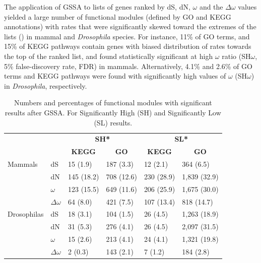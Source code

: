 The application of GSSA to lists of genes ranked by dS, dN, $\omega$ and the $\Delta\omega$ values yielded a large number of functional modules (defined by GO and KEGG annotations) with rates that were significantly skewed toward the extremes of the lists () in mammal and \textit{Drosophila} species. For instance, 11\% of GO terms, and 15\% of KEGG pathways contain genes with biased distribution of rates towards the top of the ranked list, and found statistically significant at high $\omega$ ratio (SH$\omega$, 5\% false-discovery rate, FDR) in mammals. Alternatively, 4.1\% and 2.6\% of GO terms and KEGG pathways were found with significantly high values of $\omega$ (SH$\omega$) in \textit{Drosophila}, respectively.

\begin{table}[htbp]
\begin{center}
\begin{tabular}{ l l l l l l }
\hline
 &  & \multicolumn{ 2}{c}{\textbf{SH*}} & \multicolumn{ 2}{c}{\textbf{SL*}} \\  \cline{ 3- 4} \cline{4-6}
 &  & \multicolumn{1}{c}{\textbf{KEGG }} & \multicolumn{1}{c}{\textbf{GO }} & \multicolumn{1}{c}{\textbf{KEGG }} & \multicolumn{1}{c}{\textbf{GO}} \\ \hline
\multicolumn{ 1}{l}{Mammals} &  dS  &  15 (1.9)    &  187 (3.3)   &  12 (2.1)    &  364 (6.5) \\
\multicolumn{ 1}{l}{} &  dN  &  145 (18.2)  &  708 (12.6)  &  230 (28.9)  &  1,839 (32.9) \\
\multicolumn{ 1}{l}{} & $\omega$ &  123 (15.5)  &  649 (11.6)  &  206 (25.9)  &  1,675 (30.0) \\
\multicolumn{ 1}{l}{} & $\Delta\omega$ &  64 (8.0)    &  421 (7.5)   &  107 (13.4)  &  818 (14.7) \\ \hline
\multicolumn{ 1}{l}{Drosophilas} &  dS  &  18 (3.1)    &  104 (1.5)   &  26 (4.5)    &  1,263 (18.9) \\
\multicolumn{ 1}{l}{} &  dN  &  31 (5.3)    &  276 (4.1)   &  26 (4.5)    &  2,097 (31.5) \\
\multicolumn{ 1}{l}{} & $\omega$ &  15 (2.6)    &  213 (4.1)   &  24 (4.1)    &  1,321 (19.8) \\
\multicolumn{ 1}{l}{} & $\Delta\omega$ &  2 (0.3)     &  143 (2.1)   &  7 (1.2)     &  184 (2.8) \\ \hline
\end{tabular}
\end{center}
\caption[Numbers and percentages of functional modules with significant results after GSSA.]{Numbers and percentages of functional modules with significant results after GSSA. For Significantly High (SH) and Significantly Low (SL) results.}
\label{tab:gssanum_perc}
\end{table}

